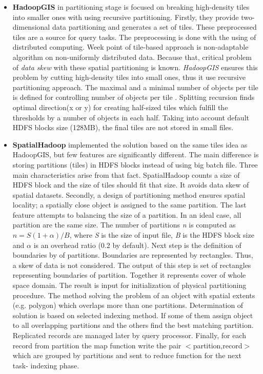 \documentclass[a4paper,12pt,oneside]{report}
\begin{document}
	\begin{itemize}
		\item \textbf{HadoopGIS} in partitioning stage is focused on breaking
		high-density tiles into smaller ones with using 
		recursive partitioning. Firstly, they provide two-dimensional data partitioning
		and generates a set of tiles.
		These preprocessed tiles are a source for query tasks. The preprocessing is done
		with the using of distributed computing.
		Week point of tile-based approach is non-adaptable algorithm on non-uniformly
		distributed data. Because that, 
		critical problem of \textit{data skew} with these spatial partitioning is
		known. \textit{HadoopGIS} ensures 
		this problem by cutting high-density tiles into small ones, thus it use
		recursive partitioning approach. The maximal and a minimal number of objects per
		tile is defined for controlling 
		number of objects per tile . Splitting recursion 
		finds optimal direction(x or y) for creating half-sized tiles which fulfill the
		thresholds by a number of objects 
		in each half.  Taking into account default HDFS blocks size (128MB), the final
		tiles are not stored in small files.
		
		\item  \textbf{SpatialHadoop} implemented the solution  based on the same tiles
		idea as HadoopGIS, but few features 
		are significantly different.
		The main difference is storing partitions (tiles) in HDFS blocks  instead of
		using big batch file. Three main characteristics arise from that fact.
		SpatialHadoop counts 
		a size of HDFS block and the size of tiles should fit that size. It avoids data
		skew of spatial datasets. 
		Secondly, a design of partitioning method ensures spatial locality; a spatially
		close object is assigned to the same 
		partition. The last feature attempts 
		to balancing the size of a partition. In an
		ideal case, all partition are the 
		same size. The number of partitions \emph{n} is computed as $n=S(1+ \alpha)/B$,
		where \emph{S} is the size of input file, \emph{B} is the HDFS block size and
		$\alpha$ is an overhead ratio (0.2 by default). 
		Next step is the definition of boundaries by of partitions. Boundaries are
		represented by rectangles. Thus, a skew of data is not considered. 
		The output of this step is set of rectangles representing  boundaries of
		partition. Together it represents cover 
		of whole space domain. The result is input for initialization of physical
		partitioning procedure. The method solving 
		the problem of an object with spatial extents (e.g. polygon) which overlaps more
		than one partitions. Determination 
		of solution is based on selected indexing method. If some of them assign object
		to all overlapping partitions and 
		the others find the best matching partition. Replicated records are managed
		later by  query processor. Finally, 
		for each record from partition the map function write the pair
		$<$partition,record$>$ which are grouped by 
		partitions and sent to reduce function for the next task- indexing phase.
	\end{itemize}
	
\end{document}
